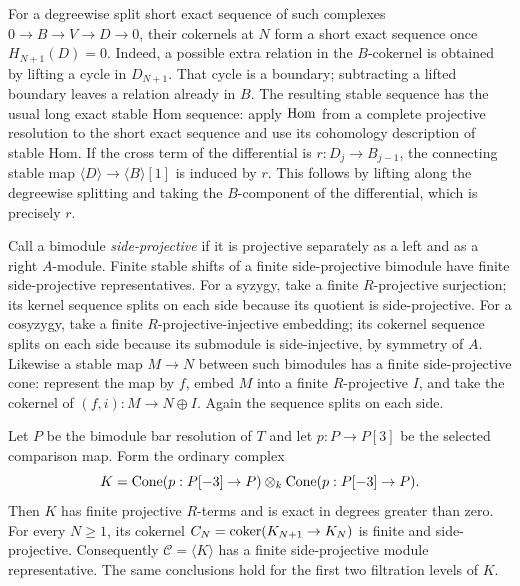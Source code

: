 For a degreewise split short exact sequence of such complexes
$0\to B\to V\to D\to0$, their cokernels at $N$ form a short exact
sequence once $H_{N+1}(D)=0$.
Indeed, a possible extra relation in the $B$-cokernel is obtained by lifting
a cycle in $D_{N+1}$. That cycle is a boundary; subtracting a lifted
boundary leaves a relation already in $B$.
The resulting stable sequence has the usual long exact stable Hom sequence:
apply $\operatorname{Hom}$ from a complete projective resolution to the short exact
sequence and use its cohomology description of stable Hom.
If the cross term of the differential is
$r:D_j\to B_{j-1}$, the connecting stable map
$\langle D\rangle\to\langle B\rangle[1]$ is induced by $r$.
This follows by lifting along the degreewise splitting and taking the
$B$-component of the differential, which is precisely $r$.

Call a bimodule \emph{side-projective} if it is projective separately as a
left and as a right $A$-module. Finite stable shifts of a finite
side-projective bimodule have finite side-projective representatives.
For a syzygy, take a finite $R$-projective surjection; its kernel sequence
splits on each side because its quotient is side-projective.
For a cosyzygy, take a finite $R$-projective-injective embedding; its
cokernel sequence splits on each side because its submodule is
side-injective, by symmetry of $A$.
Likewise a stable map $M\to N$ between such bimodules has a finite
side-projective cone: represent the map by $f$, embed $M$ into a finite
$R$-projective $I$, and take the cokernel of
$(f,i):M\to N\oplus I$. Again the sequence splits on each side.

\begin{lemma}
\label{cone:finite}
Let $P$ be the bimodule bar resolution of $T$ and let
$p:P\to P[3]$ be the selected comparison map. Form the ordinary complex
\[
 K=\operatorname{Cone}(p:P[-3]\to P)
       \otimes_{k}\operatorname{Cone}(p:P[-3]\to P).
\]
Then $K$ has finite projective $R$-terms and is exact in degrees greater
than zero. For every $N\geq1$, its cokernel
$C_N=\operatorname{coker}(K_{N+1}\to K_N)$ is finite and side-projective.
Consequently $\mathcal C=\langle K\rangle$ has a finite side-projective
module representative. The same conclusions hold for the first two
filtration levels of $K$.
\end{lemma}

